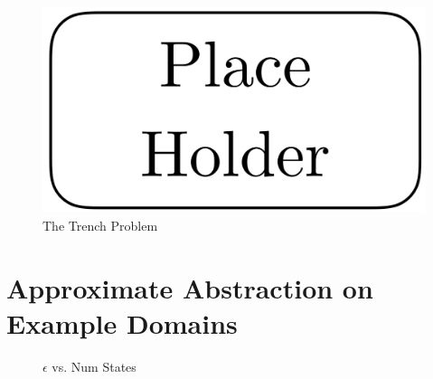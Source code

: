 \documentclass{article}
\begin{document}
\begin{figure}[h]
\centering
\includegraphics[width=0.42\columnwidth]{figures/placeholder.png}
\caption{The Trench Problem}
\label{fig:trench}
\end{figure}


\section{Approximate Abstraction on Example Domains}

\begin{figure}
\label{fig:eps-states}
\caption{$\epsilon$ vs. Num States}
\end{figure} 
\end{document}
